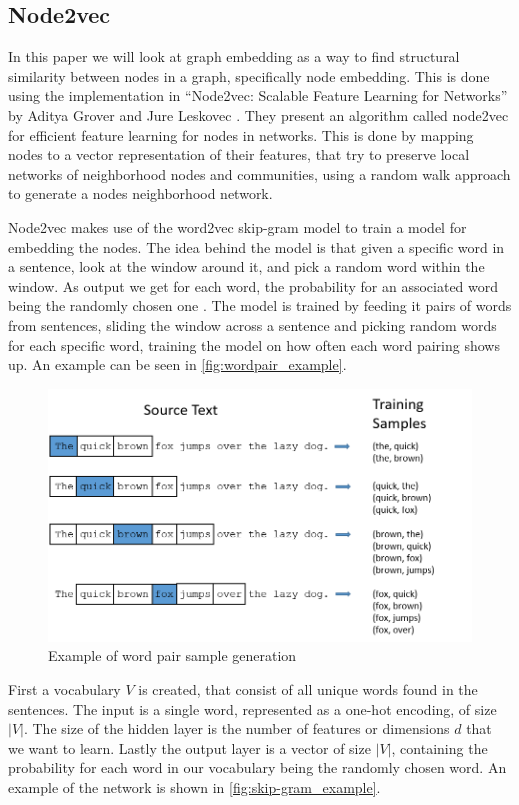 \subsection{Node2vec}
In this paper we will look at graph embedding as a way to find structural similarity between nodes in a graph, specifically node embedding. This is done using the implementation in “Node2vec: Scalable Feature Learning for Networks” by Aditya Grover and Jure Leskovec \cite{Node2vec}. They present an algorithm called node2vec for efficient feature learning for nodes in networks. This is done by mapping nodes to a vector representation of their features, that try to preserve local networks of neighborhood nodes and communities, using a random walk approach to generate a nodes neighborhood network.

Node2vec makes use of the word2vec skip-gram model to train a model for embedding the nodes.
The idea behind the model is that given a specific word in a sentence, look at the window around it, and pick a random word within the window. As output we get for each word, the probability for an associated word being the randomly chosen one \cite{Word2vec}.
The model is trained by feeding it pairs of words from sentences, sliding the window across a sentence and picking random words for each specific word, training the model on how often each word pairing shows up. An example can be seen in \autoref{fig:wordpair_example}.

\begin{figure}[H]
\centering
  \includegraphics[scale=0.6]{Article/figures/training_data.png}
  \caption{Example of word pair sample generation \cite{Word2vec}}
  \label{fig:wordpair_example}
\end{figure}

First a vocabulary $V$ is created, that consist of all unique words found in the sentences. The input is a single word, represented as a one-hot encoding, of size $|V|$. The size of the hidden layer is the number of features or dimensions $d$ that we want to learn. Lastly the output layer is a vector of size $|V|$, containing the probability for each word in our vocabulary being the randomly chosen word. An example of the network is shown in \autoref{fig:skip-gram_example}.

